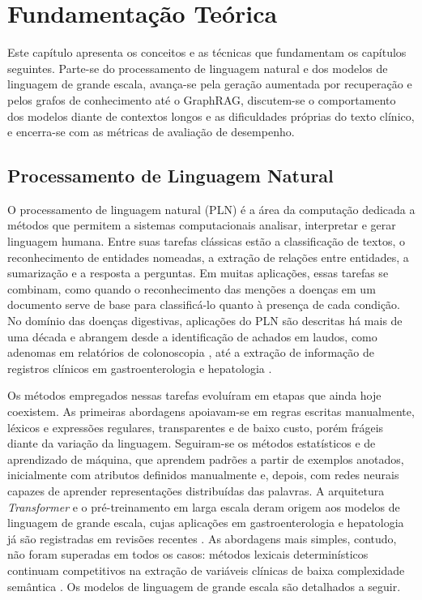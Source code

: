 \chapter{Fundamentação Teórica}\label{cap:fundamentacao}

Este capítulo apresenta os conceitos e as técnicas que fundamentam os capítulos seguintes. Parte-se do processamento de linguagem natural e dos modelos de linguagem de grande escala, avança-se pela geração aumentada por recuperação e pelos grafos de conhecimento até o GraphRAG, discutem-se o comportamento dos modelos diante de contextos longos e as dificuldades próprias do texto clínico, e encerra-se com as métricas de avaliação de desempenho.

\section{Processamento de Linguagem Natural}\label{sec:pln}

O processamento de linguagem natural (PLN) é a área da computação dedicada a métodos que permitem a sistemas computacionais analisar, interpretar e gerar linguagem humana. Entre suas tarefas clássicas estão a classificação de textos, o reconhecimento de entidades nomeadas, a extração de relações entre entidades, a sumarização e a resposta a perguntas. Em muitas aplicações, essas tarefas se combinam, como quando o reconhecimento das menções a doenças em um documento serve de base para classificá-lo quanto à presença de cada condição. No domínio das doenças digestivas, aplicações do PLN são descritas há mais de uma década \citep{hou2014} e abrangem desde a identificação de achados em laudos, como adenomas em relatórios de colonoscopia \citep{SABRIE2023350}, até a extração de informação de registros clínicos em gastroenterologia e hepatologia \citep{stammers2025}.

Os métodos empregados nessas tarefas evoluíram em etapas que ainda hoje coexistem. As primeiras abordagens apoiavam-se em regras escritas manualmente, léxicos e expressões regulares, transparentes e de baixo custo, porém frágeis diante da variação da linguagem. Seguiram-se os métodos estatísticos e de aprendizado de máquina, que aprendem padrões a partir de exemplos anotados, inicialmente com atributos definidos manualmente e, depois, com redes neurais capazes de aprender representações distribuídas das palavras. A arquitetura \textit{Transformer} e o pré-treinamento em larga escala deram origem aos modelos de linguagem de grande escala, cujas aplicações em gastroenterologia e hepatologia já são registradas em revisões recentes \citep{shahab2024,omar2025}. As abordagens mais simples, contudo, não foram superadas em todos os casos: métodos lexicais determinísticos continuam competitivos na extração de variáveis clínicas de baixa complexidade semântica \citep{pereira2026}. Os modelos de linguagem de grande escala são detalhados a seguir.

